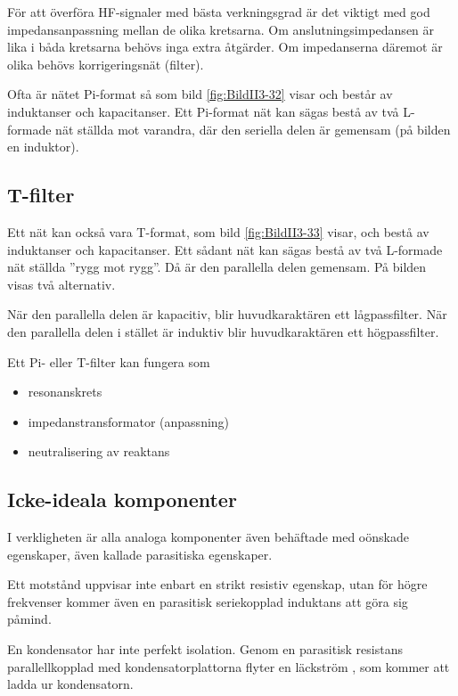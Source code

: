 För att överföra HF-signaler med bästa verkningsgrad är det viktigt med god
impedansanpassning mellan de olika kretsarna.
Om anslutningsimpedansen är lika i båda kretsarna behövs inga extra åtgärder.
Om impedanserna däremot är olika behövs korrigeringsnät (filter).

Ofta är nätet Pi-format så som bild \ref{fig:BildII3-32} visar och består av
induktanser och kapacitanser.
Ett Pi-format nät kan sägas bestå av två L-formade nät ställda mot varandra, där
den seriella delen är gemensam (på bilden en induktor).

\subsection{T-filter}


Ett nät kan också vara T-format, som bild \ref{fig:BildII3-33} visar, och bestå
av induktanser och kapacitanser.
Ett sådant nät kan sägas bestå av två L-formade nät ställda ''rygg mot rygg''.
Då är den parallella delen gemensam.
På bilden visas två alternativ.

När den parallella delen är kapacitiv, blir huvudkaraktären ett lågpassfilter. 
När den parallella delen i stället är induktiv blir huvudkaraktären ett högpassfilter.

Ett Pi- eller T-filter kan fungera som
\begin{itemize}
  \item resonanskrets
  \item impedanstransformator (anpassning)
  \item neutralisering av reaktans
\end{itemize}

\subsection{Icke-ideala komponenter}

I verkligheten är alla analoga komponenter även behäftade med oönskade egenskaper,
även kallade parasitiska egenskaper.

Ett motstånd uppvisar inte enbart en strikt resistiv egenskap, utan för högre
frekvenser kommer även en parasitisk seriekopplad induktans att göra sig påmind.

En kondensator har inte perfekt isolation. Genom en parasitisk resistans
parallellkopplad med kondensatorplattorna flyter en läckström , som kommer att
ladda ur kondensatorn.

